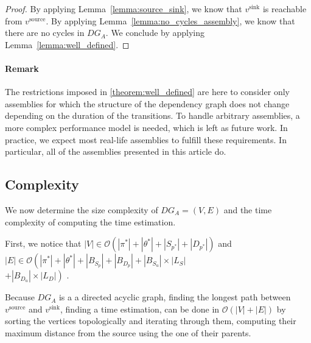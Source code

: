 \begin{proof}
 By applying Lemma~\ref{lemma:source_sink}, we know that $v^\text{sink}$ is reachable
 from $v^\text{source}$. By applying Lemma~\ref{lemma:no_cycles_assembly}, we know
 that there are no cycles in $DG_A$. We conclude by applying
 Lemma~\ref{lemma:well_defined}.
\end{proof}

\paragraph{Remark}

The restrictions imposed in \ref{theorem:well_defined} are here to consider only
assemblies for which the structure of the dependency graph does not change
depending on the duration of the transitions. To handle arbitrary assemblies,
a more complex performance model is needed, which is left as future work. In
practice, we expect most real-life assemblies to fulfill these requirements.
In particular, all of the assemblies presented in this article do.


\subsection{Complexity}

We now determine the size complexity of $DG_A=(V,E)$ and the time
complexity of computing the time estimation.

First, we notice that
$|V| \in \mathcal{O}\left(\left|\pi^*\right|+\left|\theta^*\right|+\left|S_{p^*}\right|+\left|D_{p^*}\right|\right)$
and
$|E| \in \mathcal{O}\left(\left|\pi^*\right|+\left|\theta^*\right|+\left|B_{S_p}\right|+\left|B_{D_p}\right|+\left|B_{S_u}\right|\times\left|L_S\right|\right.$ \\
$\left.+\left|B_{D_u}\right|\times\left|L_D\right|\right)$
.

Because $DG_A$ is a a directed acyclic graph, finding the longest path
between $v^\text{source}$ and $v^\text{sink}$, \ie finding a time estimation,
can be done in $\mathcal{O}(|V|+|E|)$ by sorting the
vertices topologically and iterating through them, computing their maximum
distance from the source using the one of their parents.

